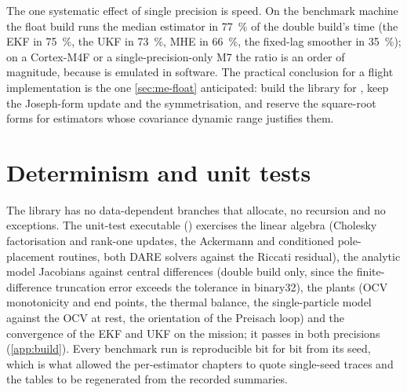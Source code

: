 The one systematic effect of single precision is speed. On the benchmark machine the float
build runs the median estimator in \SI{77}{\percent} of the double build's time (the EKF in
\SI{75}{\percent}, the UKF in \SI{73}{\percent}, MHE in \SI{66}{\percent}, the fixed-lag smoother
in \SI{35}{\percent}); on a Cortex-M4F or a single-precision-only M7 the ratio is an order of
magnitude, because  is emulated in software. The practical conclusion for a
flight implementation is the one \cref{sec:me-float} anticipated: build the library for
, keep the Joseph-form update and the symmetrisation, and reserve the square-root
forms for estimators whose covariance dynamic range justifies them.

\section{Determinism and unit tests}

The library has no data-dependent branches that allocate, no recursion and no exceptions. The
unit-test executable () exercises the linear algebra (Cholesky
factorisation and rank-one updates, the Ackermann and conditioned pole-placement routines,
both DARE solvers against the Riccati residual), the analytic model Jacobians against central
differences (double build only, since the finite-difference truncation error exceeds the
tolerance in binary32), the plants (OCV monotonicity and end points, the thermal balance, the
single-particle model against the OCV at rest, the orientation of the Preisach loop) and the
convergence of the EKF and UKF on the  mission; it passes in both
precisions (\cref{app:build}). Every benchmark run is reproducible bit for bit from its seed,
which is what allowed the per-estimator chapters to quote single-seed traces and the tables to
be regenerated from the recorded summaries.
